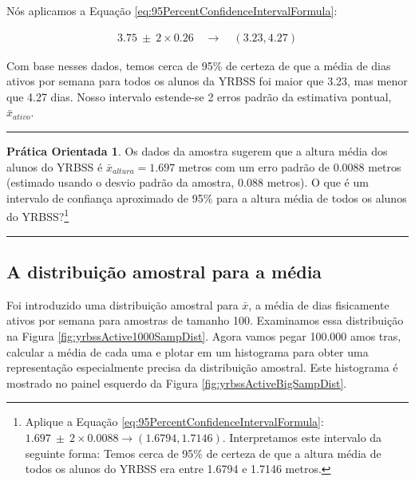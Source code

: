 \documentclass[
]{book}
\theoremstyle{definition}
\theoremstyle{definition}
\theoremstyle{definition}
\newtheorem{exercise}{Prática Orientada}[chapter]
\theoremstyle{definition}
\theoremstyle{remark}
\begin{document}
Nós aplicamos a Equação \eqref{eq:95PercentConfidenceIntervalFormula}:

\begin{eqnarray*}
3.75\ \pm\ 2 \times  0.26 \quad \rightarrow \quad (3.23, 4.27)
\end{eqnarray*}

Com base nesses dados, temos cerca de 95\% de certeza de que a média de dias ativos por semana para todos os alunos da YRBSS foi maior que 3.23, mas menor que 4.27 dias. Nosso intervalo estende-se 2 erros padrão da estimativa pontual, \(\bar{x}_{ativo}\).

\begin{center}\rule{0.5\linewidth}{0.5pt}\end{center}

\begin{exercise}
\protect\hypertarget{exr:unnamed-chunk-157}{}{\label{exr:unnamed-chunk-157} }Os dados da amostra sugerem que a altura média dos alunos do YRBSS é \(\bar{x}_{altura} = 1.697\) metros com um erro padrão de 0.0088 metros (estimado usando o desvio padrão da amostra, 0.088 metros). O que é um intervalo de confiança aproximado de 95\% para a altura média de todos os alunos do YRBSS?\footnote{Aplique a Equação \eqref{eq:95PercentConfidenceIntervalFormula}: \(1.697 \ \pm \ 2\times 0.0088 \rightarrow (1.6794, 1.7146)\). Interpretamos este intervalo da seguinte forma: Temos cerca de 95\% de certeza de que a altura média de todos os alunos do YRBSS era entre 1.6794 e 1.7146 metros.}
\end{exercise}

\begin{center}\rule{0.5\linewidth}{0.5pt}\end{center}

\hypertarget{meanSampleDistribution}{%
\subsection{A distribuição amostral para a média}\label{meanSampleDistribution}}

Foi introduzido uma distribuição amostral para \(\bar{x}\), a média de dias fisicamente ativos por semana para amostras de tamanho 100. Examinamos essa distribuição na Figura \ref{fig:yrbssActive1000SampDist}. Agora vamos pegar 100.000 amos
tras, calcular a média de cada uma e plotar em um histograma para obter uma representação especialmente precisa da distribuição amostral. Este histograma é mostrado no painel esquerdo da Figura \ref{fig:yrbssActiveBigSampDist}.
\end{document}
